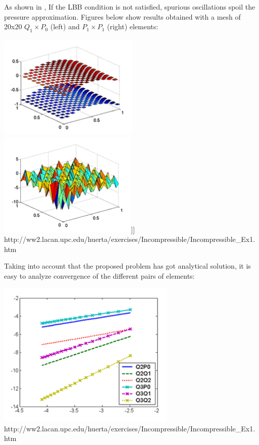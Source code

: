 As shown in \cite{dohu03}, If the LBB condition is not satisfied, spurious oscillations spoil the pressure approximation. 
Figures below show results obtained with a mesh of 20x20 $Q_1\times P_0$ (left) and $P_1\times P_1$ (right) elements:
\begin{center}
\includegraphics[height=5cm]{images/mms/Ex1_Q1P0_pres.png}
\includegraphics[height=5cm]{images/mms/Ex1_P1P1_pres.png}]]
{\small http://ww2.lacan.upc.edu/huerta/exercises/Incompressible/Incompressible\_Ex1.htm}
\end{center}

Taking into account that the proposed problem has got analytical solution, it is easy to analyze convergence of the different pairs of elements:
\begin{center}
\includegraphics[height=7cm]{images/mms/Ex1_conv_qua.png}\\
{\small http://ww2.lacan.upc.edu/huerta/exercises/Incompressible/Incompressible\_Ex1.htm}
\end{center}

